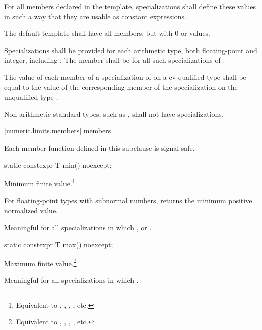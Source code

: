 \pnum
For all members declared
 
in the
template, specializations shall define these values in such a way
that they are usable as
constant expressions.

\pnum
The default
template shall have all members, but with 0 or
values.

\pnum
Specializations shall be provided for each
arithmetic type,
both floating-point and integer, including
.
The member
shall be
for all such specializations of
.

\pnum
The value of each member of a specialization of
 on a cv-qualified type
 shall be equal to the value of the corresponding member of
the specialization on the unqualified type .

\pnum
Non-arithmetic standard types, such as
, shall not have specializations.

[numeric.limits.members]{ members}

\pnum
{}%
Each member function defined in this subclause is signal-safe.

%
\begin{itemdecl}
static constexpr T min() noexcept;
\end{itemdecl}

\begin{itemdescr}
\pnum
Minimum finite value.\footnote{Equivalent to , ,
, , etc.}

%
\pnum
For floating-point types with subnormal numbers, returns the minimum positive
normalized value.

\pnum
Meaningful for all specializations in which
,
or
.
\end{itemdescr}

%
\begin{itemdecl}
static constexpr T max() noexcept;
\end{itemdecl}

\begin{itemdescr}
\pnum
Maximum finite value.\footnote{Equivalent to , ,
, , etc.}

\pnum
Meaningful for all specializations in which
.
\end{itemdescr}

